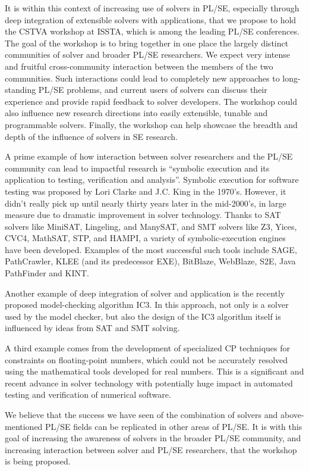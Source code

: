 \documentclass{sig-alternate}
\begin{document}
  It is within this context of increasing use of solvers
in PL/SE, especially through deep integration of extensible solvers with
applications, that we propose to hold the CSTVA workshop at ISSTA, which is
among the leading PL/SE conferences. The goal of the workshop is to bring
together in one place the largely distinct communities of solver and broader
PL/SE researchers. We expect very intense and fruitful cross-community
interaction between the members of the two communities. Such interactions could
lead to completely new approaches to long-standing PL/SE problems, and current
users of solvers can discuss their experience and provide rapid feedback to
solver developers. The workshop could also influence new research directions
into easily extensible, tunable and programmable solvers. Finally, the workshop
can help showcase the breadth and depth of the influence of solvers in SE
research. 

  A prime example of how interaction between solver researchers
and the PL/SE community can lead to impactful research is ``symbolic execution
and its application to testing, verification and analysis''. Symbolic execution
for software testing was proposed by Lori Clarke and J.C. King in the
1970's. However, it didn't really pick up until nearly thirty years later in
the mid-2000's, in large measure due to dramatic improvement in solver
technology. Thanks to SAT solvers like MiniSAT, Lingeling, and ManySAT, and SMT
solvers like Z3, Yices, CVC4, MathSAT, STP, and HAMPI, a variety of
symbolic-execution engines have been developed. Examples of the most successful
such tools include SAGE, PathCrawler, KLEE (and its predecessor EXE), BitBlaze,
WebBlaze, S2E, Java PathFinder and KINT. 

Another example of deep integration of solver and application is
the recently proposed model-checking algorithm IC3. In this approach, not only
is a solver used by the model checker, but also the design of the IC3 algorithm
itself is influenced by ideas from SAT and SMT solving.

A third example comes from the development of specialized CP
techniques for constraints on floating-point numbers, which could not be
accurately resolved using the mathematical tools developed for real
numbers. This is a significant and recent advance in solver technology with
potentially huge impact in automated testing and verification of numerical
software.

We believe that the success we have seen of the combination of
solvers and above-mentioned PL/SE fields can be replicated in other areas of
PL/SE. It is with this goal of increasing the awareness of solvers in the
broader PL/SE community, and increasing interaction between solver and PL/SE
researchers, that the workshop is being proposed.
\end{document}
